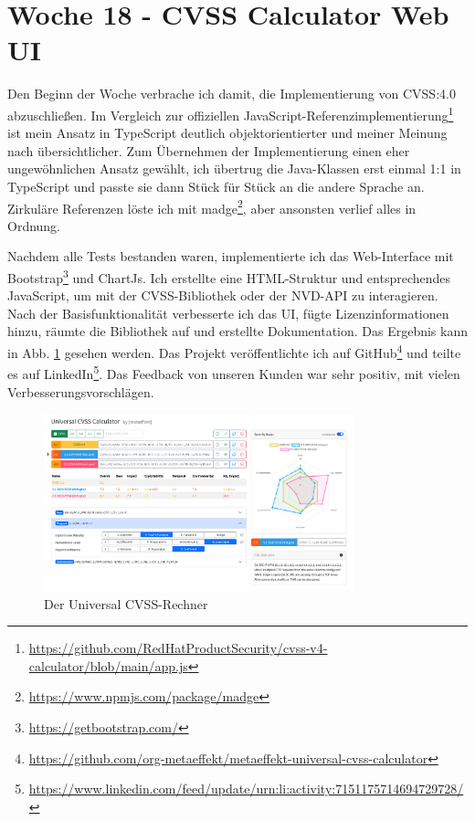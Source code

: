 \section{Woche 18 - CVSS Calculator Web UI} \label{sec:bericht-wo-18}


\lweekdaymarginpar{\weekdayMondayShort, \weekdayTuesdayShort}

Den Beginn der Woche verbrache ich damit, die Implementierung von CVSS:4.0 abzuschließen.
Im Vergleich zur offiziellen JavaScript-Referenzimplementierung\footnote{\url{https://github.com/RedHatProductSecurity/cvss-v4-calculator/blob/main/app.js}} ist mein Ansatz in TypeScript deutlich objektorientierter und meiner Meinung nach übersichtlicher.
Zum Übernehmen der Implementierung einen eher ungewöhnlichen Ansatz gewählt, ich übertrug die Java-Klassen erst einmal 1:1 in TypeScript und passte sie dann Stück für Stück an die andere Sprache an.
Zirkuläre Referenzen löste ich mit madge\footnote{\url{https://www.npmjs.com/package/madge}}, aber ansonsten verlief alles in Ordnung.

\sweekdaymarginpar{\weekdayWednesdayShort, \weekdayThursdayShort, \weekdayFridayShort}

Nachdem alle Tests bestanden waren, implementierte ich das Web-Interface mit Bootstrap\footnote{\url{https://getbootstrap.com/}} und ChartJs.
Ich erstellte eine HTML-Struktur und entsprechendes JavaScript, um mit der CVSS-Bibliothek oder der NVD-API zu interagieren.
Nach der Basisfunktionalität verbesserte ich das UI, fügte Lizenzinformationen hinzu, räumte die Bibliothek auf und erstellte Dokumentation.
Das Ergebnis kann in Abb. \ref{fig:metaeffekt-cvss-calculator-ui} gesehen werden.
Das Projekt veröffentlichte ich auf GitHub\footnote{\url{https://github.com/org-metaeffekt/metaeffekt-universal-cvss-calculator}} und teilte es auf LinkedIn\footnote{\url{https://www.linkedin.com/feed/update/urn:li:activity:7151175714694729728/}}.
Das Feedback von unseren Kunden war sehr positiv, mit vielen Verbesserungsvorschlägen.

\begin{figure}[htbp] %
    \centering
    \includegraphics[width=0.8\textwidth, keepaspectratio]{res/img/metaeffekt-cvss-calculator-ui}
    \caption{Der {\metaeffekt} Universal CVSS-Rechner}
    \label{fig:metaeffekt-cvss-calculator-ui}
\end{figure}

